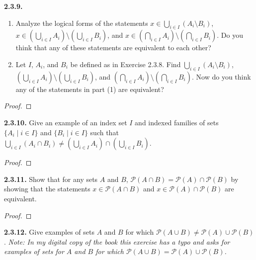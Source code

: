 \documentclass[12pt]{amsart}
\newenvironment{statement}[1]{\smallskip\noindent\color[rgb]{.6627, .3529, .6314} {\bf #1.}}{}
\theoremstyle{definition}
\theoremstyle{remark}
\begin{document}
\begin{statement}{2.3.9}
\begin{enumerate}
	\item Analyze the logical forms of the statements
	$x \in \bigcup_{i \in I} (A_i \setminus B_i)$,
	$x \in \left( \bigcup_{i \in I} A_i \right) \setminus \left( \bigcup_{i \in I} B_i \right)$, and
	$x \in \left( \bigcap_{i \in I} A_i \right) \setminus \left( \bigcap_{i \in I} B_i \right)$.
	Do you think that any of these statements are equivalent to each other?
	
	\item Let $I$, $A_i$, and $B_i$ be defined as in Exercise 2.3.8.
	Find $\bigcup_{i \in I} (A_i \setminus B_i)$,
	$\left( \bigcup_{i \in I} A_i \right) \setminus \left( \bigcup_{i \in I} B_i \right)$, and
	$\left( \bigcap_{i \in I} A_i \right) \setminus \left( \bigcap_{i \in I} B_i \right)$.
	Now do you think any of the statements in part (1) are equivalent?
\end{enumerate}
\end{statement}

\begin{proof}
\end{proof}


\begin{statement}{2.3.10}
Give an example of an index set $I$ and indexed families of sets
$\{ A_i \mid i \in I \}$ and $\{ B_i \mid i \in I \}$
such that
$\bigcup_{i \in I} (A_i \cap B_i) \neq
\left( \bigcup_{i \in I} A_i \right) \cap \left( \bigcup_{i \in I} B_i \right)$.
\end{statement}

\begin{proof}
\end{proof}


\begin{statement}{2.3.11}
Show that for any sets $A$ and $B$,
$\mathscr{P}(A \cap B) = \mathscr{P}(A) \cap \mathscr{P}(B)$
by showing that the statements $x \in \mathscr{P}(A \cap B)$ and 
$x \in \mathscr{P}(A) \cap \mathscr{P}(B)$ are equivalent.
\end{statement}

\begin{proof}
\end{proof}


\begin{statement}{2.3.12}
Give examples of sets $A$ and $B$ for which
$\mathscr{P}(A \cup B) \neq \mathscr{P}(A) \cup \mathscr{P}(B)$.
\emph{Note: In my digital copy of the book this exercise has a typo and asks for examples 
of sets for $A$ and $B$ for which
$\mathscr{P}(A \cup B) = \mathscr{P}(A) \cup \mathscr{P}(B)$.}
\end{statement}
\end{document}
